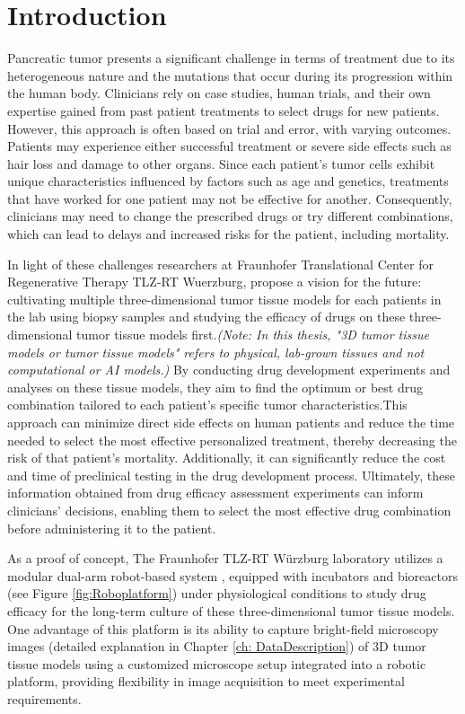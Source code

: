 \chapter{Introduction}\label{ch:intro}
Pancreatic tumor presents a significant challenge in terms of treatment due to its heterogeneous nature and the mutations that occur during its progression
 within the human body. Clinicians rely on case studies, human trials, and their own expertise gained from past patient treatments to select drugs for new 
 patients. However, this approach is often based on trial and error, with varying outcomes. Patients may experience either successful treatment or severe 
 side effects such as hair loss and damage to other organs. Since each patient's tumor cells exhibit unique characteristics influenced by factors such as 
 age and genetics, treatments that have worked for one patient may not be effective for another. Consequently, clinicians may need to change the prescribed drugs or try different combinations, which can lead to delays and increased risks for the patient, including mortality.

In light of these challenges researchers at Fraunhofer Translational Center for Regenerative Therapy TLZ-RT Wuerzburg,  propose a vision for the future: 
cultivating multiple three-dimensional tumor tissue models for each patients in the lab using biopsy samples and studying the efficacy of drugs on these 
three-dimensional tumor tissue models first.\textit{(Note: In this thesis, "3D tumor tissue models or tumor tissue models" refers to physical, lab-grown
 tissues and not computational or AI models.)} By conducting drug development experiments and analyses on these tissue models, they aim to find the optimum 
 or best drug combination tailored to each patient's specific tumor characteristics.This approach can minimize direct side effects on human patients and 
 reduce the time needed to select the most effective personalized treatment, thereby decreasing the risk of that patient's mortality. Additionally, it can 
 significantly reduce the cost and time of preclinical testing in the drug development process. Ultimately, these information obtained from drug efficacy 
  assessment experiments can inform clinicians' decisions, enabling them to select the most effective drug combination before administering it to the patient.

As a proof of concept, The Fraunhofer TLZ-RT Würzburg laboratory utilizes a modular dual-arm robot-based system \cite{Dembski2023Establishing}, equipped 
with incubators and bioreactors (see Figure \ref{fig:Roboplatform}) under physiological conditions to study drug efficacy for the
 long-term culture of these three-dimensional tumor tissue models. One advantage of this platform is its ability to capture bright-field microscopy images 
 (detailed explanation in Chapter \ref{ch: DataDescription}) of 3D tumor tissue models using a customized microscope setup integrated into a robotic 
 platform, providing flexibility in image acquisition to meet experimental requirements.


